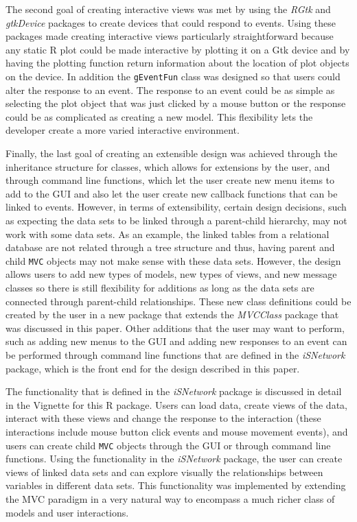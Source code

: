 \documentclass{article}[11pt]
\newcommand{\Robject}[1]{{\texttt{#1}}}
\newcommand{\Rpackage}[1]{{\textit{#1}}}
\newcommand{\Rclass}[1]{\texttt{#1}}
\begin{document}
The second goal of creating interactive views was met by using the
\Rpackage{RGtk} and \Rpackage{gtkDevice} packages to create devices that could
respond to events.  Using these packages made creating interactive views
particularly straightforward because any static R plot could be made
interactive by plotting it on a Gtk device and by having the plotting function
return information about the location of plot objects on the device.  In
addition the \Rclass{gEventFun} class was designed so that users could alter
the response to an event.  The response to an event could be as simple as
selecting the plot object that was just clicked by a mouse button or the
response could be as complicated as creating a new model.  This flexibility
lets the developer create a more varied interactive environment.

Finally, the last goal of creating an extensible design was achieved through
the inheritance structure for classes, which allows for extensions by the
user, and through command line functions, which let the user create new menu
items to add to the GUI and also let the user create new callback functions
that can be linked to events.  However, in terms of extensibility, certain
design decisions, such as expecting the data sets to be linked through a
parent-child hierarchy, may not work with some data sets.  As an example, the
linked tables from a relational database are not related through a tree
structure and thus, having parent and child \Robject{MVC} objects may not make
sense with these data sets.  However, the design allows users to add new types
of models, new types of views, and new message classes so there is still
flexibility for additions as long as the data sets are connected through
parent-child relationships.  These new class definitions could be created by
the user in a new package that extends the \Rpackage{MVCClass} package that
was discussed in this paper.  Other additions that the user may want to
perform, such as adding new menus to the GUI and adding new responses to an
event can be performed through command line functions that are defined in the
\Rpackage{iSNetwork} package, which is the front end for the design
described in this paper. 

The functionality that is defined in the \Rpackage{iSNetwork} package is
discussed in detail in the Vignette for this R package.  Users can load data,
create views of the data, interact with these views and change the response to
the interaction (these interactions include mouse button click events and
mouse movement events), and users can create child \Robject{MVC} objects
through the GUI or through command line functions.  Using the functionality in
the \Rpackage{iSNetwork} package, the user can create views of linked data sets
and can explore visually the relationships between variables in different data
sets.  This functionality was implemented by extending the MVC paradigm in a
very natural way to encompass a much richer class of models and user
interactions. 


\end{document}

